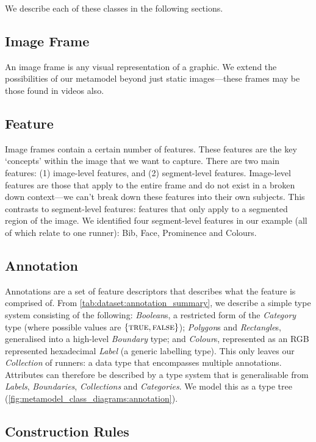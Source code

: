 We describe each of these classes in the following sections.

\subsection{Image Frame}

An image frame is any visual representation of a graphic. We extend the possibilities of our metamodel beyond just static images---these frames may be those found in videos also.

\subsection{Feature}

Image frames contain a certain number of features. These features are the key `concepts' within the image that we want to capture. There are two main features: (1) image-level features, and (2) segment-level features. Image-level features are those that apply to the entire frame and do not exist in a broken down context---we can't break down these features into their own subjects. This contrasts to segment-level features: features that only apply to a segmented region of the image. We identified four segment-level features in our example (all of which relate to one runner): Bib, Face, Prominence and Colours.

\subsection{Annotation}

Annotations are a set of feature descriptors that describes what the feature is comprised of. From \cref{tab:dataset:annotation_summary}, we describe a simple type system consisting of the following: \textit{Boolean}s, a restricted form of the \textit{Category} type (where possible values are $\{ \textsc{true}, \textsc{false} \}$); \textit{Polygon}s and \textit{Rectangle}s, generalised into a high-level \textit{Boundary} type; and \textit{Colour}s, represented as an RGB represented hexadecimal \textit{Label} (a generic labelling type). This only leaves our \textit{Collection} of runners: a data type that encompasses multiple annotations. Attributes can therefore be described by a type system that is generalisable from \textit{Labels}, \textit{Boundaries}, \textit{Collections} and \textit{Categories}. We model this as a type tree (\cref{fig:metamodel_class_diagrams:annotation}).

\subsection{Construction Rules} 

